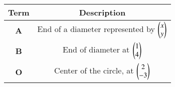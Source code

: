 \begin{tabular}[12pt]{ |c| c|}
    \hline
    \textbf{Term} & \textbf{Description}\\ 
    \hline
	\textbf{A} & End of a diameter represented by $\begin{pmatrix}x \\ y\end{pmatrix}$ \\
    \hline 
	\textbf{B} & End of diameter at $\begin{pmatrix}1 \\ 4\end{pmatrix}$ \\
    \hline
	\textbf{O} & Center of the circle, at $\begin{pmatrix}2 \\ -3\end{pmatrix}$ \\
    \hline   
    \end{tabular}
